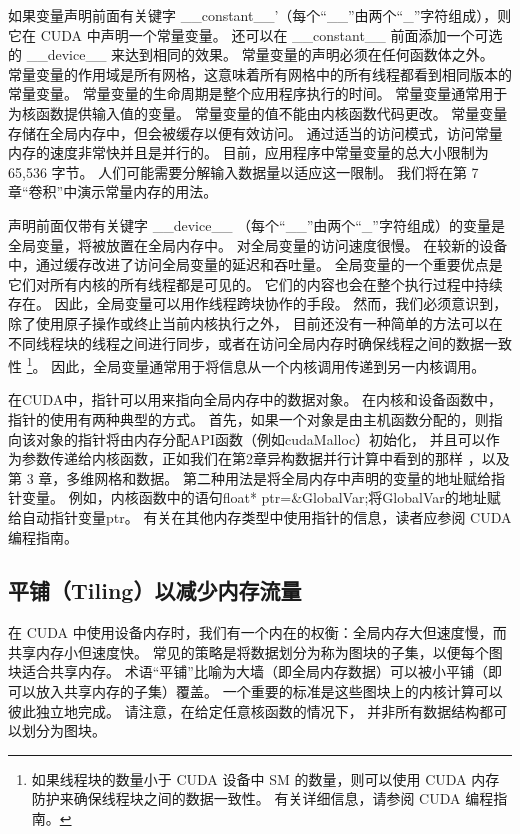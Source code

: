 如果变量声明前面有关键字 \_\_constant\_\_'（每个“\_\_”由两个“\_”字符组成），则它在 CUDA 中声明一个常量变量。 
还可以在 \_\_constant\_\_ 前面添加一个可选的 \_\_device\_\_ 来达到相同的效果。 常量变量的声明必须在任何函数体之外。 
常量变量的作用域是所有网格，这意味着所有网格中的所有线程都看到相同版本的常量变量。 
常量变量的生命周期是整个应用程序执行的时间。 常量变量通常用于为核函数提供输入值的变量。 
常量变量的值不能由内核函数代码更改。 常量变量存储在全局内存中，但会被缓存以便有效访问。 
通过适当的访问模式，访问常量内存的速度非常快并且是并行的。 目前，应用程序中常量变量的总大小限制为 65,536 字节。 
人们可能需要分解输入数据量以适应这一限制。 我们将在第 7 章“卷积”中演示常量内存的用法。

声明前面仅带有关键字 \_\_device\_\_ （每个“\_\_”由两个“\_”字符组成）的变量是全局变量，将被放置在全局内存中。 
对全局变量的访问速度很慢。 在较新的设备中，通过缓存改进了访问全局变量的延迟和吞吐量。 
全局变量的一个重要优点是它们对所有内核的所有线程都是可见的。 它们的内容也会在整个执行过程中持续存在。 
因此，全局变量可以用作线程跨块协作的手段。 然而，我们必须意识到，除了使用原子操作或终止当前内核执行之外，
目前还没有一种简单的方法可以在不同线程块的线程之间进行同步，或者在访问全局内存时确保线程之间的数据一致性
\footnote{如果线程块的数量小于 CUDA 设备中 SM 的数量，则可以使用 CUDA 内存防护来确保线程块之间的数据一致性。 
有关详细信息，请参阅 CUDA 编程指南。}。 
因此，全局变量通常用于将信息从一个内核调用传递到另一内核调用。

在CUDA中，指针可以用来指向全局内存中的数据对象。 在内核和设备函数中，指针的使用有两种典型的方式。 
首先，如果一个对象是由主机函数分配的，则指向该对象的指针将由内存分配API函数（例如cudaMalloc）初始化，
并且可以作为参数传递给内核函数，正如我们在第2章异构数据并行计算中看到的那样 ，以及第 3 章，多维网格和数据。 
第二种用法是将全局内存中声明的变量的地址赋给指针变量。 
例如，内核函数中的语句{float* ptr=\&GlobalVar;}将GlobalVar的地址赋给自动指针变量ptr。 
有关在其他内存类型中使用指针的信息，读者应参阅 CUDA 编程指南。

\subsection{平铺（Tiling）以减少内存流量}
在 CUDA 中使用设备内存时，我们有一个内在的权衡：全局内存大但速度慢，而共享内存小但速度快。 
常见的策略是将数据划分为称为图块的子集，以便每个图块适合共享内存。 
术语“平铺”比喻为大墙（即全局内存数据）可以被小平铺（即可以放入共享内存的子集）覆盖。 
一个重要的标准是这些图块上的内核计算可以彼此独立地完成。 请注意，在给定任意核函数的情况下，
并非所有数据结构都可以划分为图块。

